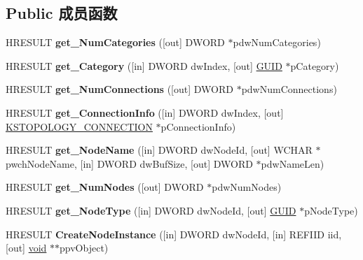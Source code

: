 \subsection*{Public 成员函数}
\begin{DoxyCompactItemize}
\item 
\mbox{\label{interface_i_ks_topology_info_ab7fd9e61e35618f1524d0666b2590b74}} 
H\+R\+E\+S\+U\+LT {\bfseries get\+\_\+\+Num\+Categories} (\mbox{[}out\mbox{]} D\+W\+O\+RD $\ast$pdw\+Num\+Categories)
\item 
\mbox{\label{interface_i_ks_topology_info_a5eb5aee101ec24b31550707aac2c1e98}} 
H\+R\+E\+S\+U\+LT {\bfseries get\+\_\+\+Category} (\mbox{[}in\mbox{]} D\+W\+O\+RD dw\+Index, \mbox{[}out\mbox{]} \hyperlink{interface_g_u_i_d}{G\+U\+ID} $\ast$p\+Category)
\item 
\mbox{\label{interface_i_ks_topology_info_a16e42713f512c07f18226e10ea64f510}} 
H\+R\+E\+S\+U\+LT {\bfseries get\+\_\+\+Num\+Connections} (\mbox{[}out\mbox{]} D\+W\+O\+RD $\ast$pdw\+Num\+Connections)
\item 
\mbox{\label{interface_i_ks_topology_info_a4a3f5fb9e82c3d529c7416280c59d27c}} 
H\+R\+E\+S\+U\+LT {\bfseries get\+\_\+\+Connection\+Info} (\mbox{[}in\mbox{]} D\+W\+O\+RD dw\+Index, \mbox{[}out\mbox{]} \hyperlink{struct_k_s_t_o_p_o_l_o_g_y___c_o_n_n_e_c_t_i_o_n}{K\+S\+T\+O\+P\+O\+L\+O\+G\+Y\+\_\+\+C\+O\+N\+N\+E\+C\+T\+I\+ON} $\ast$p\+Connection\+Info)
\item 
\mbox{\label{interface_i_ks_topology_info_a97a21a1d6e2de7a5e61d76e56c1ed535}} 
H\+R\+E\+S\+U\+LT {\bfseries get\+\_\+\+Node\+Name} (\mbox{[}in\mbox{]} D\+W\+O\+RD dw\+Node\+Id, \mbox{[}out\mbox{]} W\+C\+H\+AR $\ast$pwch\+Node\+Name, \mbox{[}in\mbox{]} D\+W\+O\+RD dw\+Buf\+Size, \mbox{[}out\mbox{]} D\+W\+O\+RD $\ast$pdw\+Name\+Len)
\item 
\mbox{\label{interface_i_ks_topology_info_a88947798a20cc76ecd55ca57be9e7c30}} 
H\+R\+E\+S\+U\+LT {\bfseries get\+\_\+\+Num\+Nodes} (\mbox{[}out\mbox{]} D\+W\+O\+RD $\ast$pdw\+Num\+Nodes)
\item 
\mbox{\label{interface_i_ks_topology_info_ac95a0ac4cdf711cb966d655500e02357}} 
H\+R\+E\+S\+U\+LT {\bfseries get\+\_\+\+Node\+Type} (\mbox{[}in\mbox{]} D\+W\+O\+RD dw\+Node\+Id, \mbox{[}out\mbox{]} \hyperlink{interface_g_u_i_d}{G\+U\+ID} $\ast$p\+Node\+Type)
\item 
\mbox{\label{interface_i_ks_topology_info_a8b2cd4ddf61ca5199c448e57738ad526}} 
H\+R\+E\+S\+U\+LT {\bfseries Create\+Node\+Instance} (\mbox{[}in\mbox{]} D\+W\+O\+RD dw\+Node\+Id, \mbox{[}in\mbox{]} R\+E\+F\+I\+ID iid, \mbox{[}out\mbox{]} \hyperlink{interfacevoid}{void} $\ast$$\ast$ppv\+Object)
\end{DoxyCompactItemize}
